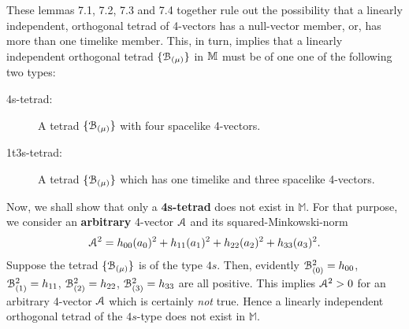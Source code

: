 These lemmas 7.1, 7.2, 7.3 and 7.4 together  rule out 
the possibility that a linearly independent,   
orthogonal tetrad of 4-vectors has a null-vector 
member, or, has more than one timelike member. This,  
in turn, implies that a linearly independent orthogonal 
tetrad $\{\EuScript{B}_{({\mu})}\}$ in $\mathbb{M}$ must be 
of one one of the following two types:
\begin{description}
\item[4s-tetrad:~] A tetrad 
$\{\EuScript{B}_{({\mu})}\}$ with four 
spacelike 4-vectors. 
\item[1t3s-tetrad:~] A tetrad 
$\{\EuScript{B}_{({\mu})}\}$ 
which has one timelike and three spacelike 4-vectors.
\end{description}
Now, we shall show that only a \textbf{4s-tetrad} does 
not exist in $\mathbb{M}$. For that 
purpose, we consider an \textbf{arbitrary} 4-vector 
$\EuScript{A}$ and its squared-Minkowski-norm
\begin{align}\label{geom.10}
\EuScript{A}^2 =h_{00}(a_0)^2+ h_{11}(a_1)^2
+ h_{22}(a_2)^2+ h_{33}(a_3)^2.
\end{align}
Suppose the tetrad $\{\EuScript{B}_{({\mu})}\}$ is of 
the type $4s$. Then, evidently  $\EuScript{B}_{(0)}^2 = 
h_{00}$, $\EuScript{B}_{(1)}^2=h_{11}$, 
$\EuScript{B}_{(2)}^2 =h_{22}$,  
$\EuScript{B}_{(3)}^2=h_{33}$  are all positive. This 
implies  $\EuScript{A}^2>0$ for an arbitrary 4-vector 
$\EuScript{A}$ which is certainly \textsl{not} true. 
Hence a  linearly independent orthogonal tetrad of the 
$4s$-type does not exist in $\mathbb{M}$.

